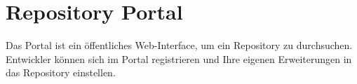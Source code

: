 \chapter{Repository Portal}
Das Portal ist ein öffentliches Web-Interface, um ein Repository zu durchsuchen. Entwickler können sich im Portal registrieren und Ihre eigenen Erweiterungen in das Repository einstellen.
